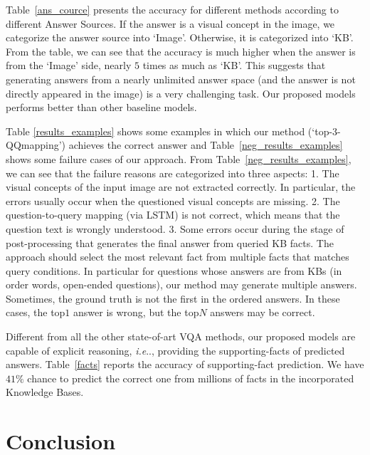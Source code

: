 \documentclass[10pt,journal]{IEEEtran}
\makeatletter
\DeclareRobustCommand\onedot{\futurelet\@let@token\@onedot}
\def\@onedot{\ifx\@let@token.\else.\null\fi\xspace}
\def\ie{\emph{i.e}\onedot} \def\Ie{\emph{I.e}\onedot}
\makeatother
\begin{document}
Table~\ref{ans_cource} presents the accuracy for different methods according to different Answer Sources. If the answer is a visual concept in the image, we categorize the answer source into `Image'. Otherwise, it is categorized into `KB'. From the table, we can see that the accuracy is much higher when the answer is from the `Image' side, nearly $5$ times as much as `KB'. This suggests that generating answers from a nearly unlimited answer space (and the answer is not directly appeared in the image) is a very challenging task. Our proposed models performs better than other baseline models.

{
Table \ref{results_examples} shows some examples in which our method (`top-3-QQmapping') achieves the correct answer and Table~\ref{neg_results_examples}
shows some failure cases of our approach.
From Table~\ref{neg_results_examples}, we can see that the failure reasons are categorized into three aspects:
1. The visual concepts of the input image are not extracted correctly. In particular, the errors usually occur when the questioned visual concepts are missing.
2. The question-to-query mapping (via LSTM) is not correct, which means that the question text is wrongly understood.
3. Some errors occur during the stage of post-processing that generates the final answer from queried KB facts.
The approach should select the most relevant fact from multiple facts that matches query conditions.
In particular for questions whose answers are from KBs (in order words, open-ended questions), our method may generate multiple answers.
Sometimes, the ground truth is not the first in the ordered answers. In these cases, the top$1$ answer is wrong, but the top$N$ answers may be correct.
}

Different from all the other state-of-art VQA methods, our proposed models are capable of explicit reasoning, \ie, providing the supporting-facts of predicted answers. Table~\ref{facts} reports the accuracy of supporting-fact prediction. We have $41\%$ chance to predict the correct one from millions of facts in the incorporated Knowledge Bases.







\section{Conclusion}
\label{conclusion}
\end{document}

